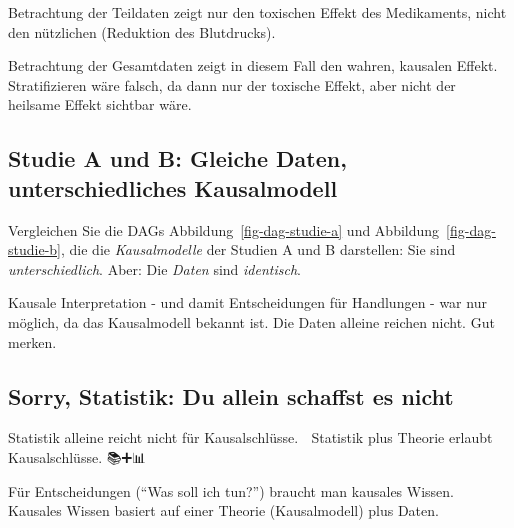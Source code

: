 \documentclass[
  a4paper,
  DIV=11]{scrreprt}
\theoremstyle{definition}
\theoremstyle{remark}
\begin{document}
Betrachtung der Teildaten zeigt nur den toxischen Effekt des
Medikaments, nicht den nützlichen (Reduktion des Blutdrucks).

\begin{tcolorbox}[enhanced jigsaw, leftrule=.75mm, toptitle=1mm, bottomtitle=1mm, titlerule=0mm, breakable, colframe=quarto-callout-important-color-frame, title=\textcolor{quarto-callout-important-color}{\faExclamation}\hspace{0.5em}{Wichtig}, rightrule=.15mm, colback=white, arc=.35mm, left=2mm, bottomrule=.15mm, coltitle=black, opacitybacktitle=0.6, toprule=.15mm, colbacktitle=quarto-callout-important-color!10!white, opacityback=0]
Betrachtung der Gesamtdaten zeigt in diesem Fall den wahren, kausalen
Effekt. Stratifizieren wäre falsch, da dann nur der toxische Effekt,
aber nicht der heilsame Effekt sichtbar wäre.
\end{tcolorbox}

\hypertarget{studie-a-und-b-gleiche-daten-unterschiedliches-kausalmodell}{%
\subsection{Studie A und B: Gleiche Daten, unterschiedliches
Kausalmodell}\label{studie-a-und-b-gleiche-daten-unterschiedliches-kausalmodell}}

Vergleichen Sie die DAGs Abbildung~\ref{fig-dag-studie-a} und
Abbildung~\ref{fig-dag-studie-b}, die die \emph{Kausalmodelle} der
Studien A und B darstellen: Sie sind \emph{unterschiedlich}. Aber: Die
\emph{Daten} sind \emph{identisch}.

Kausale Interpretation - und damit Entscheidungen für Handlungen - war
nur möglich, da das Kausalmodell bekannt ist. Die Daten alleine reichen
nicht. Gut merken.

\hypertarget{sorry-statistik-du-allein-schaffst-es-nicht}{%
\subsection{Sorry, Statistik: Du allein schaffst es
nicht}\label{sorry-statistik-du-allein-schaffst-es-nicht}}

Statistik alleine reicht nicht für Kausalschlüsse. 🧟 Statistik plus
Theorie erlaubt Kausalschlüsse. 📚➕📊 🟰 🤩

\begin{tcolorbox}[enhanced jigsaw, leftrule=.75mm, toptitle=1mm, bottomtitle=1mm, titlerule=0mm, breakable, colframe=quarto-callout-important-color-frame, title=\textcolor{quarto-callout-important-color}{\faExclamation}\hspace{0.5em}{Wichtig}, rightrule=.15mm, colback=white, arc=.35mm, left=2mm, bottomrule=.15mm, coltitle=black, opacitybacktitle=0.6, toprule=.15mm, colbacktitle=quarto-callout-important-color!10!white, opacityback=0]
Für Entscheidungen (``Was soll ich tun?'') braucht man kausales Wissen.
Kausales Wissen basiert auf einer Theorie (Kausalmodell) plus Daten.
\end{tcolorbox}
\end{document}

